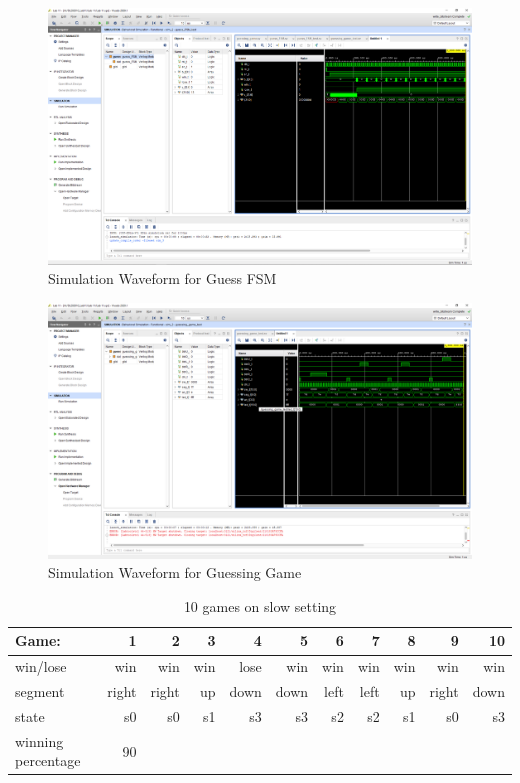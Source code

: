 \documentclass[11pt]{article}
\begin{document}
\begin{figure}[ht]\centering
	\caption{Simulation Waveform for Guess FSM}
	\includegraphics [width=1\textwidth,trim=640 500 10 135, clip]{guess_FSM_sim}
\end{figure}

\begin{figure}[ht]\centering
	\caption{Simulation Waveform for Guessing Game}
	\includegraphics [width=1\textwidth,trim=640 500 10 135, clip]{guessing_game_sim}
\end{figure}

\begin{table}[ht]\centering
	\caption{10 games on slow setting}
	\label{ALU:tbl:alu_ERT}\medskip
	\begin{tabular}{l|rrrrrrrrrr}
		Game: & 1 & 2 & 3 & 4 & 5 & 6 & 7 & 8 & 9 & 10 \\
		\midrule
		win/lose & win & win & win & lose & win & win & win & win & win & win\\
		segment & right & right & up & down & down & left & left & up & right & down \\
		state & s0 & s0 & s1 & s3 & s3 & s2 & s2 & s1 & s0 & s3\\
		\midrule
		winning percentage & 90 &  &  &  &  & & & & &\\
		\bottomrule
	\end{tabular}
\end{table}
\end{document}
